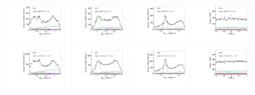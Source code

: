 \begin{figure}[htbp]
    \includegraphics[width=0.24\textwidth]{figure/pwa_nominal/s4_m_R_BC.pdf}
    \includegraphics[width=0.24\textwidth]{figure/pwa_nominal/s4_m_R_BD.pdf}
    \includegraphics[width=0.24\textwidth]{figure/pwa_nominal/s4_m_R_CD.pdf}
    \includegraphics[width=0.24\textwidth]{figure/pwa_nominal/s4_epemDSID_Lmdc_cos_beta.pdf} \\
    \includegraphics[width=0.24\textwidth]{figure/pwa_nominal/s5_m_R_BC.pdf}
    \includegraphics[width=0.24\textwidth]{figure/pwa_nominal/s5_m_R_BD.pdf}
    \includegraphics[width=0.24\textwidth]{figure/pwa_nominal/s5_m_R_CD.pdf}
    \includegraphics[width=0.24\textwidth]{figure/pwa_nominal/s5_epemDSID_Lmdc_cos_beta.pdf} \\

\end{figure}
